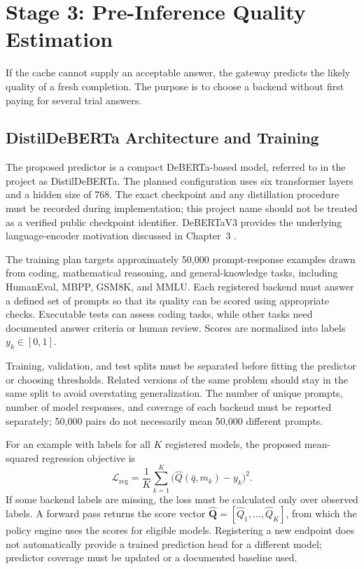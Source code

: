 \section{Stage 3: Pre-Inference Quality Estimation}
\label{sec:stage3-quality}

If the cache cannot supply an acceptable answer, the gateway predicts the likely quality of a fresh completion. The purpose is to choose a backend without first paying for several trial answers.

\subsection{DistilDeBERTa Architecture and Training}

The proposed predictor is a compact DeBERTa-based model, referred to in the project as DistilDeBERTa. The planned configuration uses six transformer layers and a hidden size of 768. The exact checkpoint and any distillation procedure must be recorded during implementation; this project name should not be treated as a verified public checkpoint identifier. DeBERTaV3 provides the underlying language-encoder motivation discussed in Chapter~3 \cite{ref:DeBERTaV3}.

The training plan targets approximately 50,000 prompt-response examples drawn from coding, mathematical reasoning, and general-knowledge tasks, including HumanEval, MBPP, GSM8K, and MMLU. Each registered backend must answer a defined set of prompts so that its quality can be scored using appropriate checks. Executable tests can assess coding tasks, while other tasks need documented answer criteria or human review. Scores are normalized into labels $y_k\in[0,1]$.

Training, validation, and test splits must be separated before fitting the predictor or choosing thresholds. Related versions of the same problem should stay in the same split to avoid overstating generalization. The number of unique prompts, number of model responses, and coverage of each backend must be reported separately; 50,000 pairs do not necessarily mean 50,000 different prompts.

For an example with labels for all $K$ registered models, the proposed mean-squared regression objective is
\begin{equation}
\mathcal{L}_{\mathrm{reg}}=
\frac{1}{K}\sum_{k=1}^{K}\bigl(\hat{Q}(\bar q,m_k)-y_k\bigr)^2.
\end{equation}
If some backend labels are missing, the loss must be calculated only over observed labels. A forward pass returns the score vector $\widehat{\mathbf{Q}}=[\hat{Q}_1,\ldots,\hat{Q}_K]$, from which the policy engine uses the scores for eligible models. Registering a new endpoint does not automatically provide a trained prediction head for a different model; predictor coverage must be updated or a documented baseline used.

